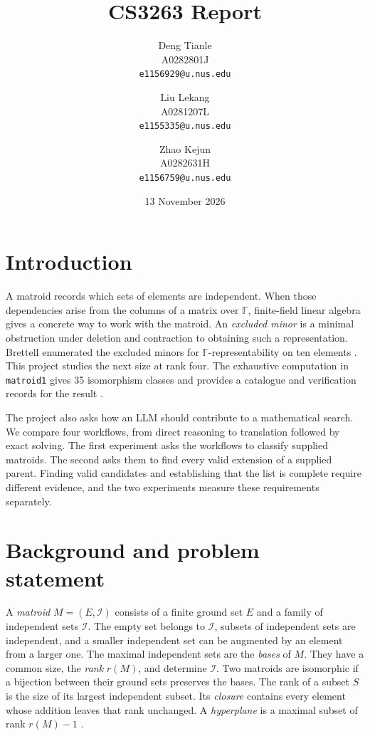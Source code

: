 \documentclass[11pt,letterpaper,titlepage]{article}
\title{CS3263 Report}
\author{
Deng Tianle \\
A0282801J \\
\texttt{e1156929@u.nus.edu}
\and
Liu Lekang \\
A0281207L \\
\texttt{e1155335@u.nus.edu}
\and
Zhao Kejun \\
A0282631H \\
\texttt{e1156759@u.nus.edu}
}
\date{13 November 2026}
\def\F{\mathbb{F}}
\begin{document}
\newtheorem{theorem}{Theorem}[section]
\newtheorem{proposition}[theorem]{Proposition}
\newtheorem{lemma}[theorem]{Lemma}
\newtheorem{corollary}[theorem]{Corollary}

\newtheorem{definition}{Definition}[section]

\theoremstyle{remark}
\newtheorem*{remark}{Remark}
\newtheorem*{example}{Example}

\maketitle
\section{Introduction}

A matroid records which sets of elements are independent. When those dependencies arise from the columns of a matrix over \(\F\), finite-field linear algebra gives a concrete way to work with the matroid. An \emph{excluded minor} is a minimal obstruction under deletion and contraction to obtaining such a representation. Brettell enumerated the excluded minors for \(\F\)-representability on ten elements \cite{brettell}. This project studies the next size at rank four. The exhaustive computation in \texttt{matroid1} gives 35 isomorphism classes and provides a catalogue and verification records for the result \cite{repo,verification}.

The project also asks how an LLM should contribute to a mathematical search. We compare four workflows, from direct reasoning to translation followed by exact solving. The first experiment asks the workflows to classify supplied matroids. The second asks them to find every valid extension of a supplied parent. Finding valid candidates and establishing that the list is complete require different evidence, and the two experiments measure these requirements separately.

\section{Background and problem statement}

A \emph{matroid} \(M=(E,\mathcal{I})\) consists of a finite ground set \(E\) and a family of independent sets \(\mathcal{I}\). The empty set belongs to \(\mathcal{I}\), subsets of independent sets are independent, and a smaller independent set can be augmented by an element from a larger one. The maximal independent sets are the \emph{bases} of \(M\). They have a common size, the \emph{rank} \(r(M)\), and determine \(\mathcal{I}\). Two matroids are isomorphic if a bijection between their ground sets preserves the bases. The rank of a subset \(S\) is the size of its largest independent subset. Its \emph{closure} contains every element whose addition leaves that rank unchanged. A \emph{hyperplane} is a maximal subset of rank \(r(M)-1\) \cite{oxley}.
\end{document}
